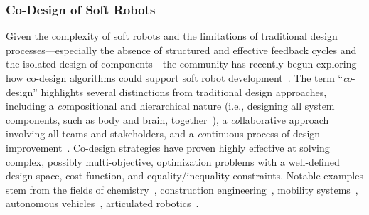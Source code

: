 \subsubsection{Co-Design of Soft Robots}
Given the complexity of soft robots and the limitations of traditional design processes—especially the absence of structured and effective feedback cycles and the isolated design of components—the community has recently begun exploring how co-design algorithms could support soft robot development~\citep{spielberg2019learning, cianchetti2021embodied, bhatia2021evolution, van2022co, wang2022curriculum, wang2023preco, wang2024diffusebot, junge2022leveraging}.
The term “\textit{co}-design” highlights several distinctions from traditional design approaches, including a \textit{co}mpositional and hierarchical nature (i.e., designing all system components, such as body and brain, together~\citep{junge2022leveraging}), a \textit{co}llaborative approach involving all teams and stakeholders, and a \textit{co}ntinuous process of design improvement~\citep{zardini2023co}.
Co-design strategies have proven highly effective at solving complex, possibly multi-objective, optimization problems with a well-defined design space, cost function, and equality/inequality constraints. 
Notable examples stem from the fields of chemistry~\citep{norskov2009towards,vaissier2018computational}, construction engineering~\citep{knippers2021integrative}, mobility systems~\citep{zardini2020co, zardini2022co}, autonomous vehicles~\citep{zardini2023co,zardini2021co}, articulated robotics~\citep{ha2018computational,zhao2020robogrammar}.

